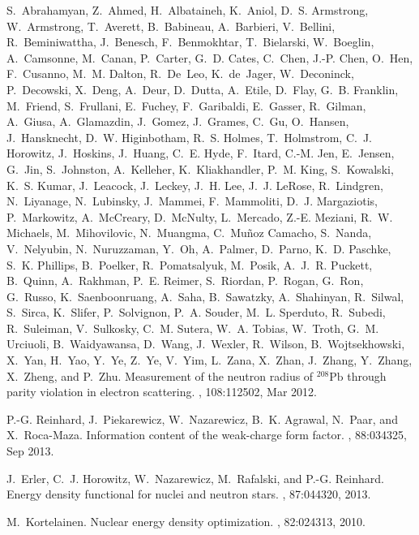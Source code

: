 \begin{thebibliography}{200}
S.~Abrahamyan, Z.~Ahmed, H.~Albataineh, K.~Aniol, D.~S. Armstrong,
  W.~Armstrong, T.~Averett, B.~Babineau, A.~Barbieri, V.~Bellini,
  R.~Beminiwattha, J.~Benesch, F.~Benmokhtar, T.~Bielarski, W.~Boeglin,
  A.~Camsonne, M.~Canan, P.~Carter, G.~D. Cates, C.~Chen, J.-P. Chen, O.~Hen,
  F.~Cusanno, M.~M. Dalton, R.~De~Leo, K.~de~Jager, W.~Deconinck, P.~Decowski,
  X.~Deng, A.~Deur, D.~Dutta, A.~Etile, D.~Flay, G.~B. Franklin, M.~Friend,
  S.~Frullani, E.~Fuchey, F.~Garibaldi, E.~Gasser, R.~Gilman, A.~Giusa,
  A.~Glamazdin, J.~Gomez, J.~Grames, C.~Gu, O.~Hansen, J.~Hansknecht, D.~W.
  Higinbotham, R.~S. Holmes, T.~Holmstrom, C.~J. Horowitz, J.~Hoskins,
  J.~Huang, C.~E. Hyde, F.~Itard, C.-M. Jen, E.~Jensen, G.~Jin, S.~Johnston,
  A.~Kelleher, K.~Kliakhandler, P.~M. King, S.~Kowalski, K.~S. Kumar,
  J.~Leacock, J.~Leckey, J.~H. Lee, J.~J. LeRose, R.~Lindgren, N.~Liyanage,
  N.~Lubinsky, J.~Mammei, F.~Mammoliti, D.~J. Margaziotis, P.~Markowitz,
  A.~McCreary, D.~McNulty, L.~Mercado, Z.-E. Meziani, R.~W. Michaels,
  M.~Mihovilovic, N.~Muangma, C.~Mu\~noz Camacho, S.~Nanda, V.~Nelyubin,
  N.~Nuruzzaman, Y.~Oh, A.~Palmer, D.~Parno, K.~D. Paschke, S.~K. Phillips,
  B.~Poelker, R.~Pomatsalyuk, M.~Posik, A.~J.~R. Puckett, B.~Quinn, A.~Rakhman,
  P.~E. Reimer, S.~Riordan, P.~Rogan, G.~Ron, G.~Russo, K.~Saenboonruang,
  A.~Saha, B.~Sawatzky, A.~Shahinyan, R.~Silwal, S.~Sirca, K.~Slifer,
  P.~Solvignon, P.~A. Souder, M.~L. Sperduto, R.~Subedi, R.~Suleiman,
  V.~Sulkosky, C.~M. Sutera, W.~A. Tobias, W.~Troth, G.~M. Urciuoli,
  B.~Waidyawansa, D.~Wang, J.~Wexler, R.~Wilson, B.~Wojtsekhowski, X.~Yan,
  H.~Yao, Y.~Ye, Z.~Ye, V.~Yim, L.~Zana, X.~Zhan, J.~Zhang, Y.~Zhang, X.~Zheng,
  and P.~Zhu.
\newblock Measurement of the neutron radius of $^{208}\mathrm{Pb}$ through
  parity violation in electron scattering.
, 108:112502, Mar 2012.

P.-G. Reinhard, J.~Piekarewicz, W.~Nazarewicz, B.~K. Agrawal, N.~Paar, and
  X.~Roca-Maza.
\newblock Information content of the weak-charge form factor.
, 88:034325, Sep 2013.

J.~Erler, C.~J. Horowitz, W.~Nazarewicz, M.~Rafalski, and P.-G. Reinhard.
\newblock Energy density functional for nuclei and neutron stars.
, 87:044320, 2013.

M.~Kortelainen.
\newblock Nuclear energy density optimization.
, 82:024313, 2010.


\end{thebibliography}

